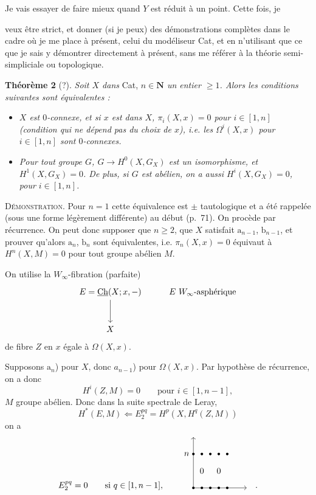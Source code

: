 \documentclass[11pt]{article}
\newcommand{\printedpage}[1]{\marginpar{\footnotesize p.~#1}}
\newcommand{\msp}[1]{\marginpar{\footnotesize [#1]}}
\newcommand{\Ch}{\underline{\mathrm{Ch}}}
\begin{document}
Je vais essayer de faire mieux quand $Y$ est réduit à un point. Cette fois, je

\printedpage{125}

\msp{page 188}
veux être strict, et donner (si je peux) des démonstrations complètes dans le cadre où je me place à présent, celui du modéliseur Cat, et en n'utilisant que ce que je sais y démontrer directement à présent, sans me référer à la théorie semi-simpliciale ou topologique.

\textbf{Théorème 2} (?). \textit{Soit $X$ dans} Cat, \textit{$n \in \mathbf{N}$ un entier $\geq 1$. Alors les conditions suivantes sont équivalentes :}

\begin{itemize}
\item[\textit{$a_n$)}] \textit{$X$ est $0$-connexe, et si $x$ est dans $X$, $\pi_i(X,x) = 0$ pour $i \in [1,n]$ (condition qui ne dépend pas du choix de $x$), i.e. les $\Omega^i(X,x)$ pour $i \in [1,n]$ sont $0$-connexes.}
\item[\textit{$b_n$)}] \textit{Pour tout groupe $G$, $G \longrightarrow H^0(X,G_X)$ est un isomorphisme, et $H^1(X,G_X) = 0$. De plus, si $G$ est abélien, on a aussi $H^i(X,G_X) = 0$, pour $i \in [1,n]$.}
\end{itemize}

\textsc{Démonstration}. Pour $n = 1$ cette équivalence est $\pm$ tautologique et a été rappelée (sous une forme légèrement différente) au début (p.~71). On procède par récurrence. On peut donc supposer que $n \geq 2$, que $X$ satisfait $\mathrm{a}_{n-1}$, $\mathrm{b}_{n-1}$, et prouver qu'alors $\mathrm{a}_n$, $\mathrm{b}_n$ sont équivalentes, i.e. $\pi_n(X,x) = 0$ équivaut à $H^n(X,M) = 0$ pour tout groupe abélien $M$.

\msp{page 189}
On utilise la $W_\infty$-fibration (parfaite)
\[
\begin{tikzcd}[row sep=large]
E = \Ch(X;x,-) \arrow[d] & E\ W_\infty\text{-asphérique} \\
X &
\end{tikzcd}
\]
de fibre $Z$ en $x$ égale à $\Omega(X,x)$.

Supposons $\mathrm{a}_n$) pour $X$, donc $a_{n-1}$) pour $\Omega(X,x)$. Par hypothèse de récurrence, on a donc
\[
H^i(Z,M) = 0 \qquad \text{pour } i \in [1,n-1],
\]
$M$ groupe abélien. Donc dans la suite spectrale de Leray,
\[
H^*(E,M) \Longleftarrow E_2^{pq} = H^p(X,H^q(Z,M))
\]
on a
\[
E_2^{pq} = 0 \qquad \text{si } q \in [1,n-1], \qquad
\begin{tikzpicture}[baseline=0]
\draw[->] (0,0) -- (2.2,0);
\draw[->] (0,0) -- (0,2.1);
\foreach \x in {0,0.35,0.7,1.05,1.4} {
  \fill (\x,0) circle (1.5pt);
  \fill (\x,1.4) circle (1.5pt);
}
\node[left] at (-0.05,1.4) {$n$};
\node at (0.35,0.7) {$0$};
\node at (1.05,0.7) {$0$};
\end{tikzpicture}
\quad .
\]
\end{document}
